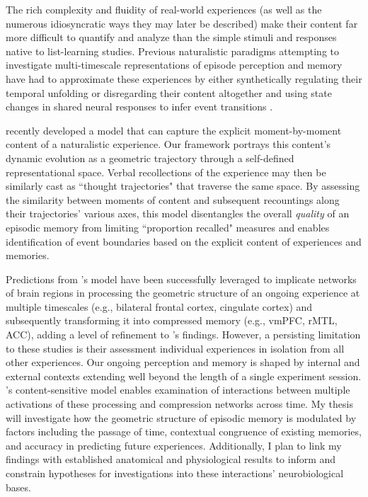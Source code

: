 \documentclass{article}
\begin{document}
The rich complexity and fluidity of real-world experiences (as well as the numerous idiosyncratic ways they may later be described) make their content far more difficult to quantify and analyze than the simple stimuli and responses native to list-learning studies.  Previous naturalistic paradigms attempting to investigate multi-timescale representations of episode perception and memory have had to approximate these experiences by either synthetically regulating their temporal unfolding \citep[e.g.,][]{LernEtal11} or disregarding their content altogether and using state changes in shared neural responses to infer event transitions \citep[e.g.,][]{HowaEtal14}.

\cite{HeusEtal18c} recently developed a model that can capture the explicit moment-by-moment content of a naturalistic experience.  Our framework portrays this content's dynamic evolution as a geometric trajectory through a self-defined representational space.  Verbal recollections of the experience may then be similarly cast as ``thought trajectories" that traverse the same space.  By assessing the similarity between moments of content and subsequent recountings along their trajectories' various axes, this model disentangles the overall \textit{quality} of an episodic memory from limiting ``proportion recalled" measures and enables identification of event boundaries based on the explicit content of experiences and memories.

Predictions from \cite{HeusEtal18c}'s model have been successfully leveraged to implicate networks of brain regions in processing the geometric structure of an ongoing experience at multiple timescales (e.g., bilateral frontal cortex, cingulate cortex) and subsequently transforming it into compressed memory (e.g., vmPFC, rMTL, ACC), adding a level of refinement to \cite{BaldEtal17}'s findings.  However, a persisting limitation to these studies is their assessment individual experiences in isolation from all other experiences.  Our ongoing perception and memory is shaped by internal and external contexts extending well beyond the length of a single experiment session. \cite{HeusEtal18c}'s content-sensitive model enables examination of interactions between multiple activations of these processing and compression networks across time.  My thesis will investigate how the geometric structure of episodic memory is modulated by factors including the passage of time, contextual congruence of existing memories, and accuracy in predicting future experiences.  Additionally, I plan to link my findings with established anatomical and physiological results to inform and constrain hypotheses for investigations into these interactions' neurobiological bases.
\end{document}
